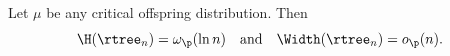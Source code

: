 \begin{theo}\label{thm:height_critical0}
Let $\mu$ be any critical offspring distribution. Then
\[
\H(\rtree_{n}) = \omega_{\p}(\ln n)
\quad \text{and} \quad
\Width(\rtree_n)=o_{\p}(n).
\]
\end{theo}
